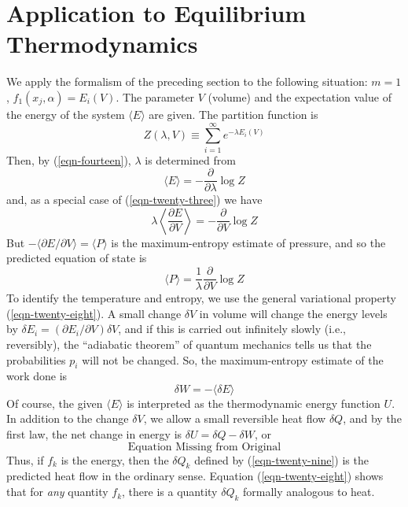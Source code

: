 \documentclass[]{article}
\begin{document}
\section{Application to Equilibrium Thermodynamics}

We apply the formalism of the preceding section to the following situation: $m =1$, $f_{1}\left( x _{ j }, \alpha\right)= E _{ i }( V ) .$ The parameter $V$ (volume)
and the expectation value of the energy of the system $\langle E\rangle$ are given. The partition function is
\begin{equation}
Z(\lambda, V) \equiv \sum_{i=1}^{\infty} e^{-\lambda E_{i}(V)}
\end{equation}
Then, by (\ref{eqn-fourteen}), $\lambda$ is determined from
\begin{equation}
\langle E\rangle=-\frac{\partial}{\partial \lambda} \log Z
\end{equation}
and, as a special case of (\ref{eqn-twenty-three}) we have
\begin{equation}
\lambda\left\langle\frac{\partial E}{\partial V}\right\rangle=-\frac{\partial}{\partial V} \log Z
\end{equation}
But $-\langle\partial E / \partial V\rangle=\langle P\rangle$ is the maximum-entropy estimate of pressure, and so the predicted equation of state is
\begin{equation}
\langle P \rangle=\frac{1}{\lambda} \frac{\partial}{\partial V} \log Z
\end{equation}
To identify the temperature and entropy, we use the general variational property (\ref{eqn-twenty-eight}). A small change $\delta V$ in volume will change the energy levels by $\delta E _{ i }=\left(\partial E _{ i } / \partial V \right) \delta V$, and if this is carried out infinitely slowly (i.e., reversibly), the ``adiabatic theorem'' of quantum mechanics tells us that the probabilities $p _{ i }$ will not be changed. So, the maximum-entropy estimate of the work done is
\begin{equation}
\delta W=-\langle\delta E\rangle
\end{equation}
Of course, the given $\langle E\rangle$ is interpreted as the thermodynamic energy function $U$. In addition to the change $\delta V$, we allow a small reversible heat flow $\delta Q$, and by the first law, the net change in energy is $\delta U =\delta Q -\delta W$, or 
%
\begin{equation}
\text{Equation Missing from Original} \label{eqn-forty}    
\end{equation}
%
Thus, if $f_{k}$ is the energy, then the $\delta Q_{k}$ defined by (\ref{eqn-twenty-nine}) is the predicted heat flow in the ordinary sense. Equation (\ref{eqn-twenty-eight}) shows that for \emph{any} quantity $f_{k}$, there is a quantity $\delta Q_{k}$ formally analogous to heat. 
\end{document}

